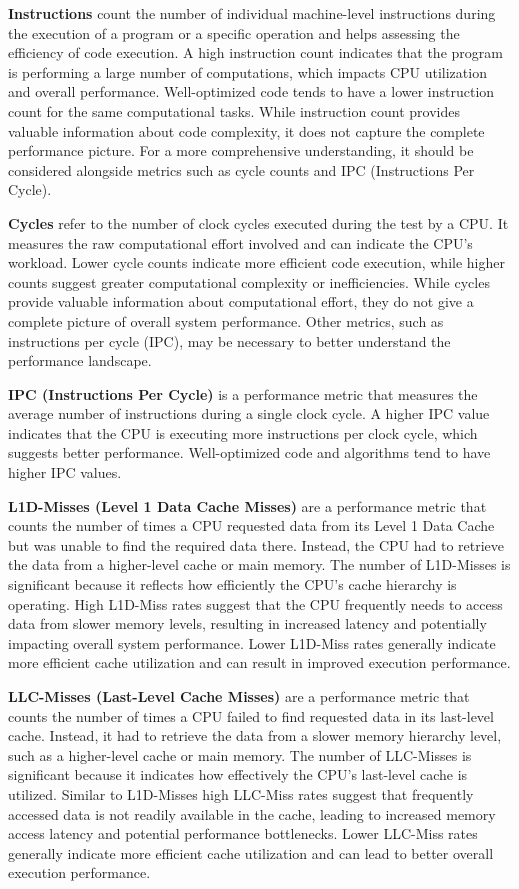 \textbf{Instructions} count the number of individual machine-level instructions during the execution of a program or a specific operation and helps assessing the efficiency of code execution. A high instruction count indicates that the program is performing a large number of computations, which impacts CPU utilization and overall performance. Well-optimized code tends to have a lower instruction count for the same computational tasks. While instruction count provides valuable information about code complexity, it does not capture the complete performance picture. For a more comprehensive understanding, it should be considered alongside metrics such as cycle counts and IPC (Instructions Per Cycle).

\textbf{Cycles} refer to the number of clock cycles executed during the test by a CPU. It measures the raw computational effort involved and can indicate the CPU's workload. Lower cycle counts indicate more efficient code execution, while higher counts suggest greater computational complexity or inefficiencies. While cycles provide valuable information about computational effort, they do not give a complete picture of overall system performance. Other metrics, such as instructions per cycle (IPC), may be necessary to better understand the performance landscape.

\textbf{IPC (Instructions Per Cycle)} is a performance metric that measures the average number of instructions during a single clock cycle. A higher IPC value indicates that the CPU is executing more instructions per clock cycle, which suggests better performance. Well-optimized code and algorithms tend to have higher IPC values.

\textbf{L1D-Misses (Level 1 Data Cache Misses)} are a performance metric that counts the number of times a CPU requested data from its Level 1 Data Cache but was unable to find the required data there. Instead, the CPU had to retrieve the data from a higher-level cache or main memory. The number of L1D-Misses is significant because it reflects how efficiently the CPU's cache hierarchy is operating. High L1D-Miss rates suggest that the CPU frequently needs to access data from slower memory levels, resulting in increased latency and potentially impacting overall system performance. Lower L1D-Miss rates generally indicate more efficient cache utilization and can result in improved execution performance.

\textbf{LLC-Misses (Last-Level Cache Misses)} are a performance metric that counts the number of times a CPU failed to find requested data in its last-level cache. Instead, it had to retrieve the data from a slower memory hierarchy level, such as a higher-level cache or main memory. The number of LLC-Misses is significant because it indicates how effectively the CPU's last-level cache is utilized. Similar to L1D-Misses high LLC-Miss rates suggest that frequently accessed data is not readily available in the cache, leading to increased memory access latency and potential performance bottlenecks. Lower LLC-Miss rates generally indicate more efficient cache utilization and can lead to better overall execution performance.

